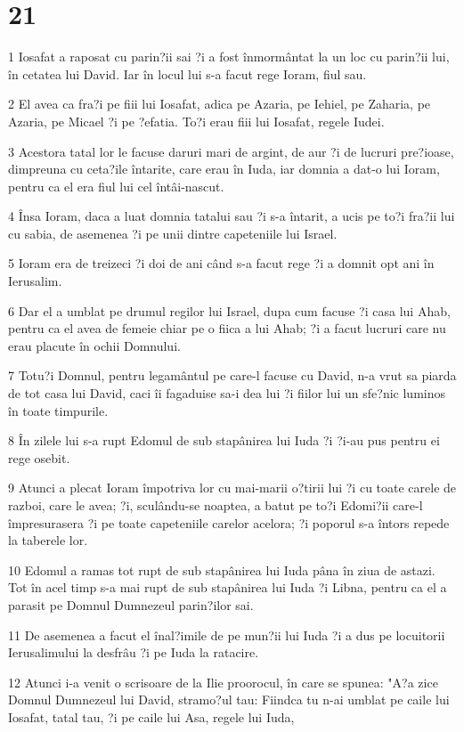\chapter{21}

\par 1 Iosafat a raposat cu parin?ii sai ?i a fost înmormântat la un loc cu parin?ii lui, în cetatea lui David. Iar în locul lui s-a facut rege Ioram, fiul sau.
\par 2 El avea ca fra?i pe fiii lui Iosafat, adica pe Azaria, pe Iehiel, pe Zaharia, pe Azaria, pe Micael ?i pe ?efatia. To?i erau fiii lui Iosafat, regele Iudei.
\par 3 Acestora tatal lor le facuse daruri mari de argint, de aur ?i de lucruri pre?ioase, dimpreuna cu ceta?ile întarite, care erau în Iuda, iar domnia a dat-o lui Ioram, pentru ca el era fiul lui cel întâi-nascut.
\par 4 Însa Ioram, daca a luat domnia tatalui sau ?i s-a întarit, a ucis pe to?i fra?ii lui cu sabia, de asemenea ?i pe unii dintre capeteniile lui Israel.
\par 5 Ioram era de treizeci ?i doi de ani când s-a facut rege ?i a domnit opt ani în Ierusalim.
\par 6 Dar el a umblat pe drumul regilor lui Israel, dupa cum facuse ?i casa lui Ahab, pentru ca el avea de femeie chiar pe o fiica a lui Ahab; ?i a facut lucruri care nu erau placute în ochii Domnului.
\par 7 Totu?i Domnul, pentru legamântul pe care-l facuse cu David, n-a vrut sa piarda de tot casa lui David, caci îi fagaduise sa-i dea lui ?i fiilor lui un sfe?nic luminos în toate timpurile.
\par 8 În zilele lui s-a rupt Edomul de sub stapânirea lui Iuda ?i ?i-au pus pentru ei rege osebit.
\par 9 Atunci a plecat Ioram împotriva lor cu mai-marii o?tirii lui ?i cu toate carele de razboi, care le avea; ?i, sculându-se noaptea, a batut pe to?i Edomi?ii care-l împresurasera ?i pe toate capeteniile carelor acelora; ?i poporul s-a întors repede la taberele lor.
\par 10 Edomul a ramas tot rupt de sub stapânirea lui Iuda pâna în ziua de astazi. Tot în acel timp s-a mai rupt de sub stapânirea lui Iuda ?i Libna, pentru ca el a parasit pe Domnul Dumnezeul parin?ilor sai.
\par 11 De asemenea a facut el înal?imile de pe mun?ii lui Iuda ?i a dus pe locuitorii Ierusalimului la desfrâu ?i pe Iuda la ratacire.
\par 12 Atunci i-a venit o scrisoare de la Ilie proorocul, în care se spunea: "A?a zice Domnul Dumnezeul lui David, stramo?ul tau: Fiindca tu n-ai umblat pe caile lui Iosafat, tatal tau, ?i pe caile lui Asa, regele lui Iuda,
